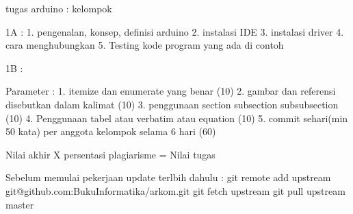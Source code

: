 tugas arduino :
kelompok

1A :
1. pengenalan, konsep, definisi arduino
2. instalasi IDE
3. instalasi driver
4. cara menghubungkan
5. Testing kode program yang ada di contoh

1B :



Parameter :
1. itemize dan enumerate yang benar (10)
2. gambar dan referensi disebutkan dalam kalimat (10)
3. penggunaan section subsection subsubsection (10)
4. Penggunaan tabel atau verbatim atau equation (10)
5. commit sehari(min 50 kata) per anggota kelompok selama 6 hari (60)

Nilai akhir X persentasi plagiarisme = Nilai tugas

Sebelum memulai pekerjaan update terlbih dahulu :
git remote add upstream git@github.com:BukuInformatika/arkom.git
git fetch upstream
git pull upstream master